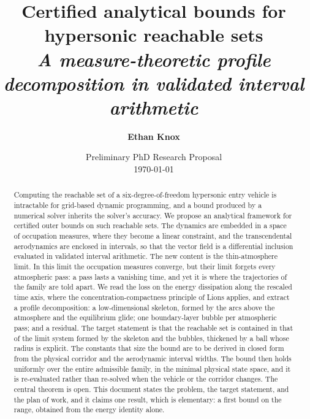 \documentclass[english,11pt]{extarticle}
\begin{document}
\title{\textbf{Certified analytical bounds for hypersonic reachable sets}\\[0.4em]
  {\large\normalfont\textit{A measure-theoretic profile decomposition in
  validated interval arithmetic}}}
\author{\textbf{Ethan Knox}}
\date{Preliminary PhD Research Proposal \\[0.5em] \today}

\maketitle

\begin{abstract}
Computing the reachable set of a six-degree-of-freedom hypersonic entry
vehicle is intractable for grid-based dynamic programming, and a bound
produced by a numerical solver inherits the solver's accuracy. We propose
an analytical framework for certified outer bounds on such reachable sets.
The dynamics are embedded in a space of occupation measures, where they
become a linear constraint, and the transcendental aerodynamics are
enclosed in intervals, so that the vector field is a differential inclusion
evaluated in validated interval arithmetic. The new content is the
thin-atmosphere limit. In this limit the occupation measures converge, but
their limit forgets every atmospheric pass: a pass lasts a vanishing time,
and yet it is where the trajectories of the family are told apart. We read
the loss on the energy dissipation along the rescaled time axis, where the
concentration-compactness principle of Lions applies, and extract a profile
decomposition: a low-dimensional skeleton, formed by the arcs above the
atmosphere and the equilibrium glide; one boundary-layer bubble per
atmospheric pass; and a residual. The target statement is that the
reachable set is contained in that of the limit system formed by the
skeleton and the bubbles, thickened by a ball whose radius is explicit. The
constants that size the bound are to be derived in closed form from the
physical corridor and the aerodynamic interval widths. The bound then holds
uniformly over the entire admissible family, in the minimal physical state
space, and it is re-evaluated rather than re-solved when the vehicle or the
corridor changes. The central theorem is open. This document states the
problem, the target statement, and the plan of work, and it claims one
result, which is elementary: a first bound on the range, obtained from the
energy identity alone.
\end{abstract}
\pagebreak
\end{document}
